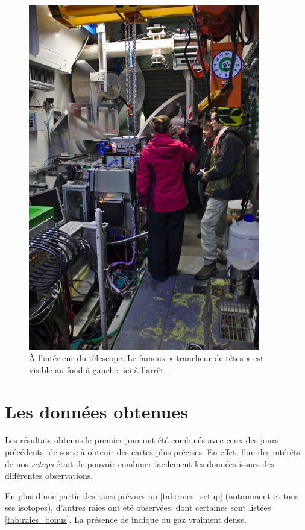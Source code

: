 \documentclass[a4paper,10pt,french]{article}
\begin{document}
\begin{figure}[!ht]
    \centering
    \includegraphics[width=0.9\textwidth]{inside.jpg}
    \caption{À l’intérieur du télescope. Le fameux « trancheur de têtes » est
    visible au fond à gauche, ici à l’arrêt.}
\end{figure}

\section{Les données obtenues}
\label{sec:resultats}

Les résultats obtenus le premier jour ont été combinés avec ceux des jours
précédents, de sorte à obtenir des cartes plus précises. En effet, l’un des
intérêts de nos \textit{setups} était de pouvoir combiner facilement les
données issues des différentes observations.

En plus d’une partie des raies prévues au \cref{tab:raies_setup} (notamment
 et tous ses isotopes), d’autres raies ont été observées, dont certaines
sont listées \cref{tab:raies_bonus}. La présence de  indique du gaz
vraiment dense.
\end{document}
